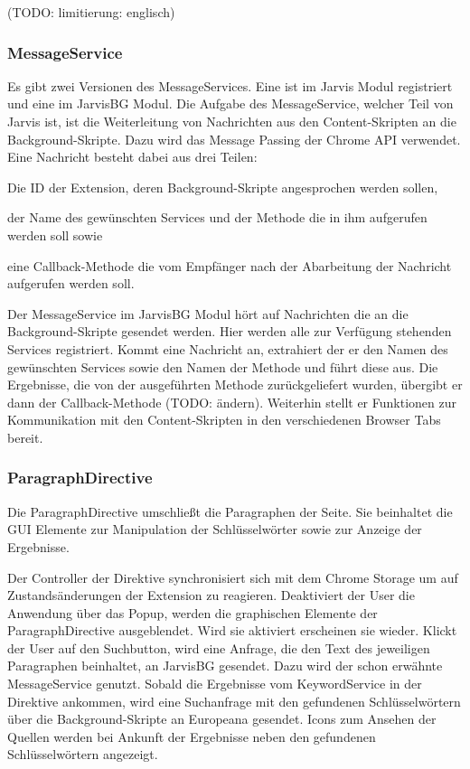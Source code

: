   (TODO: limitierung: englisch)

  \subsubsection{MessageService}
  Es gibt zwei Versionen des MessageServices. Eine ist im Jarvis Modul registriert und eine im JarvisBG Modul. Die Aufgabe des MessageService, welcher Teil von Jarvis ist, ist die Weiterleitung von Nachrichten aus den Content-Skripten an die Background-Skripte. Dazu wird das Message Passing der Chrome API verwendet. Eine Nachricht besteht dabei aus drei Teilen:
  \begin{enumerate*}
 	\item Die ID der Extension, deren Background-Skripte angesprochen werden sollen,
  	\item der Name des gewünschten Services und der Methode die in ihm aufgerufen werden soll sowie
 	\item eine Callback-Methode die vom Empfänger nach der Abarbeitung der Nachricht aufgerufen werden soll. 
  \end{enumerate*} 

  Der MessageService im JarvisBG Modul hört auf Nachrichten die an die Background-Skripte gesendet werden. Hier werden alle zur Verfügung stehenden Services registriert. Kommt eine Nachricht an, extrahiert der er den Namen des gewünschten Services sowie den Namen der Methode und führt diese aus. Die Ergebnisse, die von der ausgeführten Methode zurückgeliefert wurden, übergibt er dann der Callback-Methode (TODO: ändern). Weiterhin stellt er Funktionen zur Kommunikation mit den Content-Skripten in den verschiedenen Browser Tabs bereit.

  \subsubsection{ParagraphDirective}
  Die ParagraphDirective umschließt die Paragraphen der Seite. Sie beinhaltet die GUI Elemente zur Manipulation der Schlüsselwörter sowie zur Anzeige der Ergebnisse. 

  Der Controller der Direktive synchronisiert sich mit dem Chrome Storage um auf Zustandsänderungen der Extension zu reagieren. Deaktiviert der User die Anwendung über das Popup, werden die graphischen Elemente der ParagraphDirective ausgeblendet. Wird sie aktiviert erscheinen sie wieder. Klickt der User auf den Suchbutton, wird eine Anfrage, die den Text des jeweiligen Paragraphen beinhaltet, an JarvisBG gesendet. Dazu wird der schon erwähnte MessageService genutzt. Sobald die Ergebnisse vom KeywordService in der Direktive ankommen, wird eine Suchanfrage mit den gefundenen Schlüsselwörtern über die Background-Skripte an Europeana gesendet. Icons zum Ansehen der Quellen werden bei Ankunft der Ergebnisse neben den gefundenen Schlüsselwörtern angezeigt.

